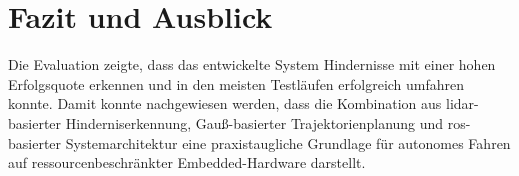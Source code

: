 \section{Fazit und Ausblick}
\label{sec:fazit_ausblick}

Die Evaluation zeigte, dass das entwickelte System Hindernisse mit einer hohen Erfolgsquote erkennen und in den meisten Testläufen erfolgreich umfahren konnte. Damit konnte nachgewiesen werden, dass die Kombination aus \gls{lidar}-basierter Hinderniserkennung, Gauß-basierter Trajektorienplanung und \gls{ros}-basierter Systemarchitektur eine praxistaugliche Grundlage für autonomes Fahren auf ressourcenbeschränkter Embedded-Hardware darstellt.

